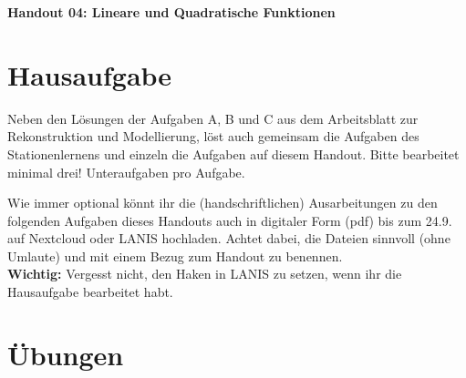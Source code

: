 \documentclass[a4paper,ngerman,12pt]{exam}
\begin{document}
\vspace*{0.3cm}
\begin{center}
	\huge\bfseries Handout 04: Lineare und Quadratische Funktionen
\end{center}

\section*{Hausaufgabe}

\par Neben den Lösungen der Aufgaben A, B und C aus dem Arbeitsblatt zur Rekonstruktion und Modellierung, löst auch gemeinsam die Aufgaben des Stationenlernens und einzeln die Aufgaben auf diesem Handout. Bitte bearbeitet minimal drei! Unteraufgaben pro Aufgabe.

\par Wie immer optional könnt ihr die (handschriftlichen) Ausarbeitungen zu den folgenden Aufgaben dieses Handouts auch in digitaler Form (pdf) bis zum 24.9. auf Nextcloud oder LANIS hochladen. Achtet dabei, die Dateien sinnvoll (ohne Umlaute) und mit einem Bezug zum Handout zu benennen.\\ \textbf{Wichtig:} Vergesst nicht, den Haken in LANIS zu setzen, wenn ihr die Hausaufgabe bearbeitet habt.

\section*{Übungen}
\end{document}
